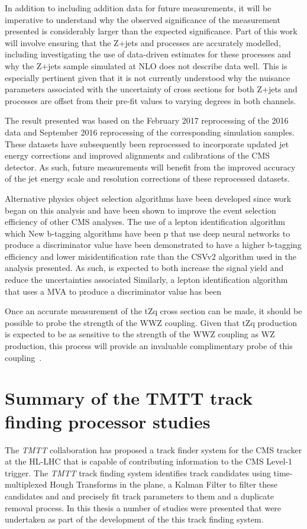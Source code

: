 In addition to including addition data for future measurements, it will be imperative to understand why the observed significance of the measurement presented is considerably larger than the expected significance.
Part of this work will involve ensuring that the Z+jets and \ttbar processes are accurately modelled, including investigating the use of data-driven estimates for these processes and why the Z+jets sample simulated at NLO does not describe data well.
This is especially pertinent given that it is not currently understood why the nuisance parameters associated with the uncertainty of cross sections for both Z+jets and \ttbar processes are offset from their pre-fit values to varying degrees in both channels.

The result presented was based on the February 2017 reprocessing of the 2016 data and September 2016 reprocessing of the corresponding simulation samples.
These datasets have subsequently been reprocessed to incorporate updated jet energy corrections and improved alignments and calibrations of the CMS detector.
As such, future measurements will benefit from the improved accuracy of the jet energy scale and resolution corrections of these reprocessed datasets.

Alternative physics object selection algorithms have been developed since work began on this  analysis and have been shown to improve the event selection efficiency of other CMS analyses.
The use of a lepton identification algorithm which 
New b-tagging algorithms have been p
that use deep neural networks to produce a discriminator value have been demonstrated to have a higher b-tagging efficiency and lower misidentification rate than the CSVv2 algorithm used in the analysis presented.
As such, is expected to both increase the signal yield and reduce the uncertainties associated 
Similarly, a lepton identification algorithm that uses a MVA to produce a discriminator value has been 


Once an accurate measurement of the tZq cross section can be made, it should be possible to probe the strength of the WWZ coupling.
Given that tZq production is expected to be as sensitive to the strength of the WWZ coupling as WZ production, this process will provide an invaluable complimentary probe of this coupling~\cite{Campbell:2013yla}.

\section{Summary of the TMTT track finding processor studies}
The \emph{TMTT} collaboration has proposed a track finder system for the CMS tracker at the HL-LHC that is capable of contributing information to the CMS Level-1 trigger.
The \emph{TMTT} track finding system identifies track candidates using time-multiplexed Hough Transforms in the \rphi plane, a Kalman Filter to filter these candidates and and precisely fit track parameters to them and a duplicate removal process.
In this thesis a number of studies were presented that were undertaken as part of the development of the this track finding system.

